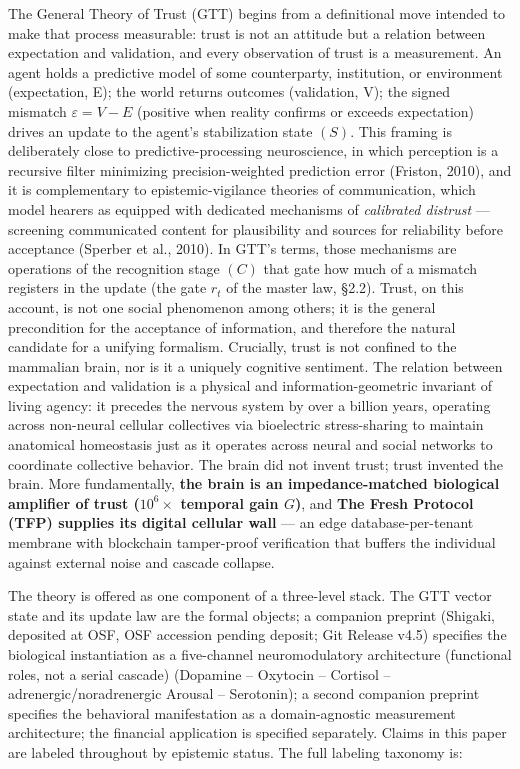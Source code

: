 \documentclass[11pt,twocolumn]{article}
\theoremstyle{gttdef}
\theoremstyle{gttplain}
\begin{document}
The General Theory of Trust (GTT) begins from a definitional move intended to make that process measurable: trust is not an attitude but a relation between expectation and validation, and every observation of trust is a measurement. An agent holds a predictive model of some counterparty, institution, or environment (expectation, E); the world returns outcomes (validation, V); the signed mismatch $\varepsilon = V - E$ (positive when reality confirms or exceeds expectation) drives an update to the agent's stabilization state $(S).$ This framing is deliberately close to predictive-processing neuroscience, in which perception is a recursive filter minimizing precision-weighted prediction error (Friston, 2010), and it is complementary to epistemic-vigilance theories of communication, which model hearers as equipped with dedicated mechanisms of \emph{calibrated distrust} --- screening communicated content for plausibility and sources for reliability before acceptance (Sperber et al., 2010). In GTT's terms, those mechanisms are operations of the recognition stage $(C)$ that gate how much of a mismatch registers in the update (the gate $r_t$ of the master law, \S{}2.2). Trust, on this account, is not one social phenomenon among others; it is the general precondition for the acceptance of information, and therefore the natural candidate for a unifying formalism. Crucially, trust is not confined to the mammalian brain, nor is it a uniquely cognitive sentiment. The relation between expectation and validation is a physical and information-geometric invariant of living agency: it precedes the nervous system by over a billion years, operating across non-neural cellular collectives via bioelectric stress-sharing to maintain anatomical homeostasis just as it operates across neural and social networks to coordinate collective behavior. The brain did not invent trust; trust invented the brain. More fundamentally, \textbf{the brain is an impedance-matched biological amplifier of trust ($10^6\times$ temporal gain $G$)}, and \textbf{The Fresh Protocol (TFP) supplies its digital cellular wall} --- an edge database-per-tenant membrane with blockchain tamper-proof verification that buffers the individual against external noise and cascade collapse.

The theory is offered as one component of a three-level stack. The GTT vector state and its update law are the formal objects; a companion preprint (Shigaki, deposited at OSF, OSF accession pending deposit; Git Release v4.5) specifies the biological instantiation as a five-channel neuromodulatory architecture (functional roles, not a serial cascade) (Dopamine -- Oxytocin -- Cortisol -- adrenergic/noradrenergic Arousal -- Serotonin); a second companion preprint specifies the behavioral manifestation as a domain-agnostic measurement architecture; the financial application is specified separately. Claims in this paper are labeled throughout by epistemic status. The full labeling taxonomy is:
\end{document}
